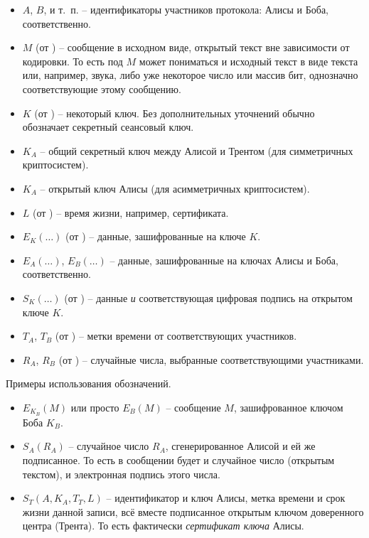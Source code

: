 \begin{itemize}
    \item $A$, $B$, и т.~п. -- идентификаторы участников протокола: Алисы и Боба, соответственно.
	\item $M$ (от ) -- сообщение в исходном виде, открытый текст вне зависимости от кодировки. То есть под $M$ может пониматься и исходный текст в виде текста или, например, звука, либо уже некоторое число или массив бит, однозначно соответствующие этому сообщению.
	\item $K$ (от ) -- некоторый ключ. Без дополнительных уточнений обычно обозначает секретный сеансовый ключ.
	\item $K_A$ -- общий секретный ключ между Алисой и Трентом (для симметричных криптосистем).
	\item $K_A$ -- открытый ключ Алисы (для асимметричных криптосистем).
	\item $L$ (от ) -- время жизни, например, сертификата.
	\item $E_K \left( \dots \right)$ (от ) -- данные, зашифрованные на ключе $K$.
	\item $E_A \left( \dots \right)$, $E_B \left( \dots \right)$ -- данные, зашифрованные на ключах Алисы и Боба, соответственно.
	\item $S_K \left( \dots \right)$ (от ) -- данные \emph{и} соответствующая цифровая подпись на открытом ключе $K$.
	\item $T_A$, $T_B$ (от ) -- метки времени от соответствующих участников.
	\item $R_A$, $R_B$ (от ) -- случайные числа, выбранные соответствующими участниками.
\end{itemize}

Примеры использования обозначений.

\begin{itemize}
	\item $E_{K_B}( M )$ или просто $E_B( M )$ -- сообщение $M$, зашифрованное ключом Боба $K_B$.
    \item $S_A( R_A )$ -- случайное число $R_A$, сгенерированное Алисой и ей же подписанное. То есть в сообщении будет и случайное число (открытым текстом), и электронная подпись этого числа.
    \item $S_T( A, K_A, T_T, L)$ -- идентификатор и ключ Алисы, метка времени и срок жизни данной записи, всё вместе подписанное открытым ключом доверенного центра (Трента). То есть фактически \emph{сертификат ключа} Алисы.
\end{itemize}